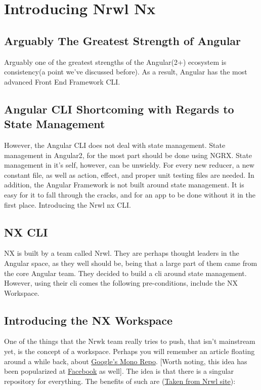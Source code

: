 
\chapter{Introducing Nrwl Nx}

\section{Arguably The Greatest Strength of Angular}

Arguably one of the greatest strengths of the Angular(2+) ecosystem is
consistency(a point we've discussed before). As a result, Angular has the most
advanced Front End Framework CLI.

\section{Angular CLI Shortcoming with Regards to State Management}

However, the Angular CLI does not deal with state management. State management
in Angular2, for the most part should be done using NGRX. State management in
it's self, however, can be unwieldy. For every new reducer, a new constant file,
as well as action, effect, and proper unit testing files are needed.
In addition, the Angular Framework is not built around state management. It is
easy for it to fall through the cracks, and for an app to be done without it in
the first place. Introducing the Nrwl nx CLI.

\section{NX CLI}
NX is built by a team called Nrwl. They are perhaps thought leaders in the
Angular space, as they well should be, being that a large part of them came
from the core Angular team. They decided to build a cli around state management.
However, using their cli comes the following pre-conditions, include the NX
Workspace.

\section{Introducing the NX Workspace}
One of the things that the Nrwk team really tries to push, that isn't mainstream
yet, is the concept of a workspace. Perhaps you will remember an article
floating around a while back, about
\href{https://cacm.acm.org/magazines/2016/7/204032-why-google-stores-billions-of-lines-of-code-in-a-single-repository/fulltext}
{Google's Mono Repo}. [Worth noting, this idea
has been popularized at
\href{https://code.facebook.com/posts/218678814984400/scaling-mercurial-at-facebook/}{Facebook}
as well]. The idea is that there is a singular repository for everything.
The benefits of such are
(\href{https://nrwl.io/nx/why-a-workspace}{Taken from Nrwl site}):

